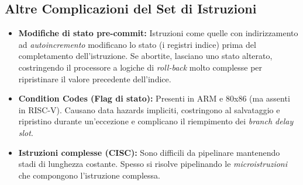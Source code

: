 \subsection{Altre Complicazioni del Set di Istruzioni}
\begin{itemize}
    \item \textbf{Modifiche di stato pre-commit:} Istruzioni come quelle con indirizzamento ad \textit{autoincremento} modificano lo stato (i registri indice) prima del completamento dell'istruzione. Se abortite, lasciano uno stato alterato, costringendo il processore a logiche di \textit{roll-back} molto complesse per ripristinare il valore precedente dell'indice.
    \item \textbf{Condition Codes (Flag di stato):} Presenti in ARM e 80x86 (ma assenti in RISC-V). Causano data hazards impliciti, costringono al salvataggio e ripristino durante un'eccezione e complicano il riempimento dei \textit{branch delay slot}.
    \item \textbf{Istruzioni complesse (CISC):} Sono difficili da pipelinare mantenendo stadi di lunghezza costante. Spesso si risolve pipelinando le \textit{microistruzioni} che compongono l'istruzione complessa.
\end{itemize}